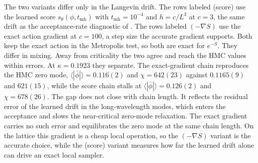 \documentclass[reprint,twocolumn,superscriptaddress,preprintnumbers,amsmath,amssymb,aps,prd,floatfix]{revtex4-2}
\begin{document}
The two variants differ only in the Langevin drift. The rows labeled (score) use the learned score $s_\theta(\phi,t_{\text{mh}})$ with $t_{\text{mh}}=10^{-4}$ and $h=c/L^{3}$ at $c=3$, the same drift as the acceptance-rate diagnostic of . The rows labeled $(-\nabla S)$ use the exact action gradient at $c=100$, a step size the accurate gradient supports. Both keep the exact action in the Metropolis test, so both are exact for $e^{-S}$. They differ in mixing. Away from criticality the two agree and reach the HMC values within errors. At $\kappa=0.1923$ they separate. The exact-gradient chain reproduces the HMC zero mode, $\langle|\bar\phi|\rangle=0.116(2)$ and $\chi=642(23)$ against $0.1165(9)$ and $621(15)$, while the score chain stalls at $\langle|\bar\phi|\rangle=0.126(2)$ and $\chi=678(26)$. The gap does not close with chain length. It reflects the residual error of the learned drift in the long-wavelength modes, which enters the acceptance and slows the near-critical zero-mode relaxation. The exact gradient carries no such error and equilibrates the zero mode at the same chain length. On the lattice this gradient is a cheap local operation, so the $(-\nabla S)$ variant is the accurate choice, while the (score) variant measures how far the learned drift alone can drive an exact local sampler.
\end{document}
